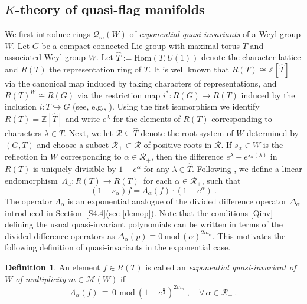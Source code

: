 \documentclass[11pt]{amsart}
\theoremstyle{definition}
\newtheorem{defi}[theorem]{Definition}
\theoremstyle{remark}
\numberwithin{equation}{section}
\newcommand{\la}{\label}
\newcommand{\into}{\hookrightarrow}
\def\M{\mathcal{M}}
\def\cQ{\mathcal{Q}}
\def\Z{\mathbb{Z}}
\def\R{\mathcal{R}}
\def\Hom{\mathrm{Hom}}
\begin{document}
\subsection{$K$-theory of quasi-flag manifolds} 
\la{S6.2}
We first introduce rings $ \cQ_m(W) $ of {\it exponential quasi-invariants} of a Weyl group $W$. Let $G$ be a compact connected Lie group with maximal torus $T$ and associated Weyl group $W$. Let $ \hat{T} := \Hom(T, U(1)) $ denote the character lattice and $R(T)$ the representation ring of $T$. It is well known that $ R(T) \cong \Z[\hat{T}] $ via the canonical map induced by taking characters of representations, and $ R(T)^W \cong R(G) $ via the restriction map $ i^*: R(G) \to R(T) $ induced by the inclusion $ i: T \into G $ (see, e.g., \cite[Chap. IX, Sect. 3]{Bou82}). Using the first isomorphism we identify $ R(T) = \Z[\hat{T}] $ and write $ e^{\lambda} $ for the elements of $ R(T) $ corresponding to characters $ \lambda \in \hat{T} $. Next, we let $ \R \subseteq \hat{T} $ denote the root system of $W$ determined by $(G,T)$ and choose a subset $ \R_+ \subset \R $ of positive roots in $ \R $. If $ s_\alpha \in W $ is the reflection in $W$ corresponding to $ \alpha \in \R_+ $, then the difference $ e^{\lambda} - e^{s_{\alpha}(\lambda)} $ in $ R(T)$ is uniquely divisible by $ 1 - e^{\alpha} $ for any $\lambda \in \hat{T}$. Following \cite{D74},  we define a linear endomorphism $\, \Lambda_{\alpha}: R(T) \to R(T)\,$ for each $\alpha \in \R_+ $, such that
%
\begin{equation}
\la{extdem}
(1 - s_\alpha) f = \Lambda_{\alpha}(f) \cdot (1 - e^{\alpha})\ .
\end{equation}
%
The operator $ \Lambda_\alpha $ is an exponential analogue of the divided difference operator $ \Delta_\alpha $ introduced
in Section~\ref{S4.4}(see \eqref{demop}). Note that the conditions \eqref{Qinv} defining the usual quasi-invariant polynomials 
can be written in terms of the divided difference operators as $ \Delta_\alpha(p) \equiv 0 \ \mbox{mod}\, (\alpha)^{2 m_\alpha} $.
This motivates the following definition  of quasi-invariants in the exponential case.
%
\begin{defi}
\la{Expqi}
An element $ f \in R(T)$ is called an {\it exponential quasi-invariant of $W$ of multiplicity} $ m \in \M(W) $ if
%
\begin{equation}
\la{EQinv}
\Lambda_{\alpha}(f) \,\equiv\, 0 \ \,\mbox{mod}\ (1 - e^{\frac{\alpha}{2}})^{2 m_\alpha}\ ,\quad 
\forall\,  \alpha \in \R_+\ .
\end{equation}
%
\end{defi}
\end{document}
